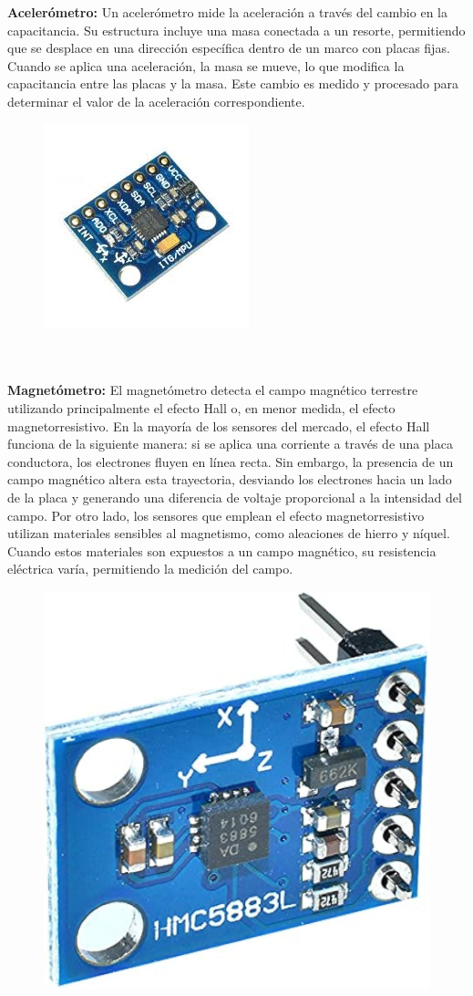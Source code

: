 \textbf{Acelerómetro:}
Un acelerómetro mide la aceleración a través del cambio en la capacitancia. Su estructura incluye una masa conectada a un resorte, permitiendo que se desplace en una dirección específica dentro de un marco con placas fijas. Cuando se aplica una aceleración, la masa se mueve, lo que modifica la capacitancia entre las placas y la masa. Este cambio es medido y procesado para determinar el valor de la aceleración correspondiente.
\vspace{10pt}  %

\begin{figure}[h]
	\centering
	\includegraphics[width=0.3\linewidth, height=0.3\textheight]{img/acelerometro}
	\caption{}
	\label{fig:acelerometro}
\end{figure}

\textbf{}\\\\

\textbf{Magnetómetro:}
El magnetómetro detecta el campo magnético terrestre utilizando principalmente el efecto Hall o, en menor medida, el efecto magnetorresistivo. En la mayoría de los sensores del mercado, el efecto Hall funciona de la siguiente manera: si se aplica una corriente a través de una placa conductora, los electrones fluyen en línea recta. Sin embargo, la presencia de un campo magnético altera esta trayectoria, desviando los electrones hacia un lado de la placa y generando una diferencia de voltaje proporcional a la intensidad del campo. Por otro lado, los sensores que emplean el efecto magnetorresistivo utilizan materiales sensibles al magnetismo, como aleaciones de hierro y níquel. Cuando estos materiales son expuestos a un campo magnético, su resistencia eléctrica varía, permitiendo la medición del campo.
\vspace{10pt}  %

\begin{figure}[h]
	\centering
	\includegraphics[width=0.3\linewidth]{img/magneto}
	\caption{}
	\label{fig:magneto}
\end{figure}

